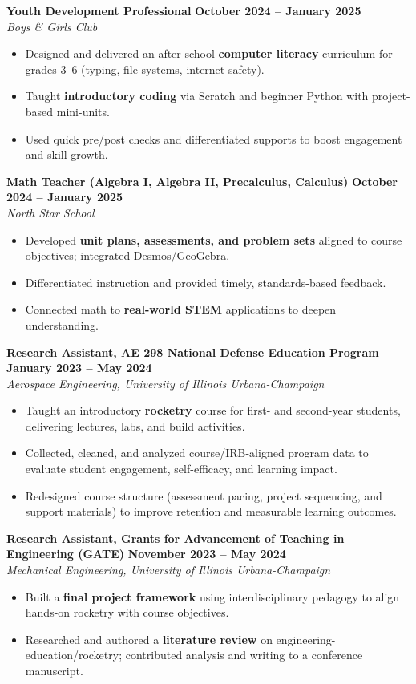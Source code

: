 \documentclass[10pt]{article}
\begin{document}
	\textbf{Youth Development Professional} \hfill \textbf{October 2024 -- January 2025} \\
	\emph{Boys \& Girls Club}
	\begin{itemize}
		\item Designed and delivered an after-school \textbf{computer literacy} curriculum for grades 3--6 (typing, file systems, internet safety).
		\item Taught \textbf{introductory coding} via Scratch and beginner Python with project-based mini-units.
		\item Used quick pre/post checks and differentiated supports to boost engagement and skill growth.
	\end{itemize}
	
	\textbf{Math Teacher (Algebra I, Algebra II, Precalculus, Calculus)} \hfill \textbf{October 2024 -- January 2025} \\
	\emph{North Star School}
	\begin{itemize}
		\item Developed \textbf{unit plans, assessments, and problem sets} aligned to course objectives; integrated Desmos/GeoGebra.
		\item Differentiated instruction and provided timely, standards-based feedback.
		\item Connected math to \textbf{real-world STEM} applications to deepen understanding.
	\end{itemize}
	
	\textbf{Research Assistant, AE 298 National Defense Education Program} \hfill \textbf{January 2023 -- May 2024} \\
	\emph{Aerospace Engineering, University of Illinois Urbana-Champaign}
	\begin{itemize}
		\item Taught an introductory \textbf{rocketry} course for first- and second-year students, delivering lectures, labs, and build activities.
		\item Collected, cleaned, and analyzed course/IRB-aligned program data to evaluate student engagement, self-efficacy, and learning impact.
		\item Redesigned course structure (assessment pacing, project sequencing, and support materials) to improve retention and measurable learning outcomes.
	\end{itemize}
	
	\textbf{Research Assistant, Grants for Advancement of Teaching in Engineering (GATE)} \hfill \textbf{November 2023 -- May 2024} \\
	\emph{Mechanical Engineering, University of Illinois Urbana-Champaign}
	\begin{itemize}
		\item Built a \textbf{final project framework} using interdisciplinary pedagogy to align hands-on rocketry with course objectives.
		\item Researched and authored a \textbf{literature review} on engineering-education/rocketry; contributed analysis and writing to a conference manuscript.
	\end{itemize}
\end{document}
